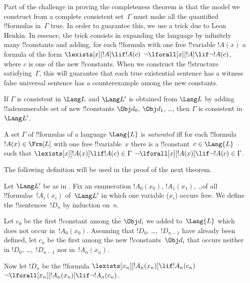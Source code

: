 \documentclass[../../../include/open-logic-section]{subfiles}
\begin{document}


\begin{explain}
Part of the challenge in proving the completeness theorem is that the
model we construct from a complete consistent set~$\Gamma$ must make
all the quantified !!{formula}s in~$\Gamma$ true.  In order to
guarantee this, we use a trick due to Leon Henkin.  In essence, the
trick consists in expanding the language by infinitely many !!{constant}s
and adding, for each !!{formula} with one free !!{variable} $!A(x)$ a
formula of the form
      {$\lexists[x][!A] \lif !A(c)$}
      {$\lnot\lforall[x][!A] \lif \lnot !A(c)$},
where $c$ is one of the new !!{constant}s.  When we construct the
!!{structure} satisfying~$\Gamma$, this will guarantee that each
{true existential sentence has a witness}
{false universal sentence has a counterexample}
among the new constants.
\end{explain}

\begin{prop}
If $\Gamma$ is consistent in $\Lang L$ and $\Lang L'$ is obtained from
$\Lang L$ by adding !!a{denumerable} set of new !!{constant}s $\Obj d_0$,
$\Obj d_1$, \dots, then $\Gamma$ is consistent in~$\Lang L'$.
\end{prop}

\begin{defn}
A set $\Gamma$ of !!{formula}s of a language $\Lang {L}$ is
\emph{saturated} iff for each !!{formula} $!A(x) \in \Frm[L]$ with one
free !!{variable}~$x$ there is a !!{constant}~$c \in \Lang{L}$ such
that
      {$\lexists[x][!A(x)] \lif !A(c) \in \Gamma$}
      {$\lnot\lforall[x][!A(x)] \lif \lnot !A(c) \in \Gamma$}.
\end{defn}

The following definition will be used in the proof of the next theorem.

\begin{defn}
Let $\Lang L'$ be as in .  Fix an enumeration
$!A_0(x_0)$, $!A_1(x_1)$, \dots of all !!{formula}s~$!A_i(x_i)$
of~$\Lang L'$ in which one variable ($x_i$) occurs free.  We define
the !!{sentence}s~$!D_n$ by induction on~$n$.

Let $c_0$ be the first !!{constant} among the $\Obj d_i$ we added
to~$\Lang{L}$ which does not occur in~$!A_0(x_0)$.  Assuming that
$!D_0$, \dots,~$!D_{n-1}$ have already been defined, let $c_n$ be the
first among the new !!{constant}s~$\Obj d_i$ that occurs neither in
$!D_0$, \dots,~$!D_{n-1}$ nor in~$!A_n(x_n)$.

Now let $!D_{n}$ be the !!{formula} 
{$\lexists[x_{n}][!A_{n}(x_{n})] \lif
  !A_{n}(c_{n})$}{$\lnot\lforall[x_{n}][!A_{n}(x_{n})] \lif \lnot
  !A_{n}(c_{n})$}.
\end{defn}
\end{document}
